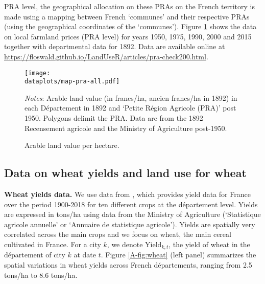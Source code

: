 \documentclass[11pt]{report}
\newcommand{\dataplots}{../../output/data/plots}
\begin{document}
PRA level, the geographical allocation on these PRAs on the French territory is made using a mapping between French `communes' and their respective PRAs (using the geographical coordinates of the `communes'). Figure \ref{A-fig:arablevalueall} shows the data on local farmland prices (PRA level) for years 1950, 1975, 1990, 2000 and 2015 together with departmental data for 1892. Data are available online at \url{https://floswald.github.io/LandUseR/articles/pra-check200.html}.


\begin{figure}[h!]
	\begin{adjustbox}{center}
		\texttt{[image: \\dataplots/map-pra-all.pdf]}
	\end{adjustbox}
	\caption{Arable land value per hectare.}
	\label{A-fig:arablevalueall}
	{\footnotesize \textit{Notes}: Arable land value (in francs/ha, ancien francs/ha in 1892) in each Département in 1892 and `Petite Région Agricole (PRA)' post 1950. Polygons delimit the PRA. Data are from the 1892 Recensement agricole and the Ministry of Agriculture post-1950.}
\end{figure}



\subsection{Data on wheat yields and land use for wheat}\label{A-sec:yields}

\noindent \textbf{Wheat yields data.} We use data from \cite{schaubergeretal2022}, which provides yield data for France over the period 1900-2018 for ten different crops at the département level. Yields are expressed in tons/ha using data from the Ministry of Agriculture (‘Statistique agricole annuelle’ or ‘Annuaire de statistique agricole’). Yields are spatially very correlated across the main crops and we focus on wheat, the main cereal cultivated in France. For a city $k$, we denote $\text{Yield}_{k,t}$, the yield of wheat in the département of city $k$ at date $t$. Figure \ref{A-fig:wheat} (left panel) summarizes the spatial variations in wheat yields across French départements, ranging from 2.5 tons/ha to 8.6 tons/ha. 
\end{document}
